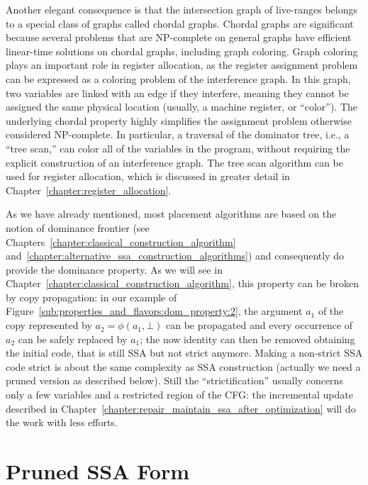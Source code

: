 Another elegant consequence is that the intersection graph of live-ranges belongs to a special class of graphs called chordal graphs. 
Chordal graphs are significant because several problems that are NP-complete on general graphs have efficient linear-time solutions on chordal graphs, including graph coloring. 
Graph coloring plays an important role in register allocation, as the register assignment problem can be expressed as a coloring problem of the interference graph. 
In this graph, two variables are linked with an edge if they interfere, meaning they cannot be assigned the same physical location (usually, a machine register, or ``color''). 
The underlying chordal property highly simplifies the assignment problem otherwise considered NP-complete. 
In particular, a traversal of the dominator tree, i.e., a ``tree scan,'' can color all of the variables in the program, without requiring the explicit construction of an interference graph. 
The tree scan algorithm can be used for register allocation\ifregin, which is discussed in greater detail in Chapter~\ref{chapter:register_allocation}\fi.

As we have already mentioned, most \phifun placement algorithms are based on the notion of dominance frontier (see Chapters~\ref{chapter:classical_construction_algorithm} and~\ref{chapter:alternative_ssa_construction_algorithms}) and consequently do provide the dominance property. 
As we will see in Chapter~\ref{chapter:classical_construction_algorithm}, this property can be broken by copy propagation:  in our example of Figure~\ref{sub:properties_and_flavors:dom_property:2}, the argument $a_1$ of the copy represented by $a_2=\phi(a_1,\bot)$ can be propagated and every occurrence of $a_2$ can be safely replaced by $a_1$; 
the now identity \phifun can then be removed obtaining the initial code, that is still SSA but not strict anymore. 
Making a non-strict SSA code strict is about the same complexity as SSA construction (actually we need a pruned version as described below). 
Still the ``strictification'' usually concerns only a few variables and a restricted region of the CFG:  the incremental update described in Chapter~\ref{chapter:repair_maintain_ssa_after_optimization} will do the work with less efforts.

\section{Pruned SSA Form}
\label{sec-prop-pruned}

